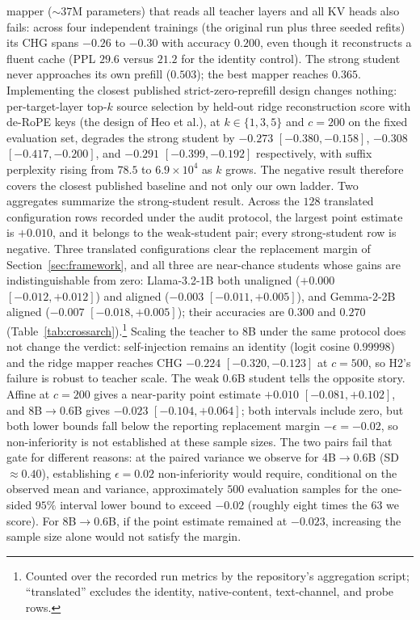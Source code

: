 \documentclass[10pt]{article}
\begin{document}
mapper ($\sim$$37$M parameters) that reads all teacher layers and all KV heads
also fails: across four independent trainings (the original run plus three
seeded refits) its CHG spans $-0.26$ to $-0.30$ with accuracy $0.200$, even
though it reconstructs a fluent cache (PPL $29.6$
versus $21.2$ for the identity control). The strong student never
approaches its own prefill ($0.503$); the best mapper reaches $0.365$.
Implementing the closest published strict-zero-reprefill design changes nothing:
per-target-layer top-$k$ source selection by held-out ridge reconstruction score
with de-RoPE keys (the design of Heo et al.), at $k\in\{1,3,5\}$ and $c{=}200$
on the fixed evaluation set, degrades the strong student by $-0.273$
$[-0.380,-0.158]$, $-0.308$ $[-0.417,-0.200]$, and $-0.291$
$[-0.399,-0.192]$ respectively, with suffix perplexity rising from $78.5$ to
$6.9\times10^{4}$ as $k$ grows. The negative result therefore covers the closest
published baseline and not only our own ladder. Two
aggregates summarize the strong-student result. Across the $128$ translated configuration
rows recorded under the audit protocol, the largest point estimate is $+0.010$,
and it belongs to the weak-student pair; every strong-student row is negative.
Three translated configurations clear the replacement margin of
Section~\ref{sec:framework}, and all three are near-chance students whose gains
are indistinguishable from zero: Llama-3.2-1B both unaligned ($+0.000$
$[-0.012, +0.012]$) and aligned ($-0.003$ $[-0.011, +0.005]$), and Gemma-2-2B
aligned ($-0.007$ $[-0.018, +0.005]$); their accuracies are $0.300$ and $0.270$
(Table~\ref{tab:crossarch}).\footnote{Counted over the recorded run metrics by the repository's
aggregation script; ``translated'' excludes the identity, native-content,
text-channel, and probe rows.} Scaling
the teacher to 8B under the same protocol does not change the verdict:
self-injection remains an identity (logit cosine $0.99998$) and the ridge
mapper reaches CHG $-0.224$ $[-0.320, -0.123]$ at $c{=}500$, so H2's failure
is robust to teacher scale. The
weak 0.6B student tells the opposite story. Affine at $c{=}200$ gives a
near-parity point estimate $+0.010$ $[-0.081, +0.102]$, and 8B$\to$0.6B gives
$-0.023$ $[-0.104, +0.064]$; both intervals include zero, but both lower
bounds fall below the reporting replacement margin $-\epsilon=-0.02$, so
non-inferiority is not established at these sample sizes. The two pairs fail
that gate for different reasons: at the paired variance we observe for
4B$\to$0.6B (SD $\approx 0.40$), establishing $\epsilon{=}0.02$
non-inferiority would require, conditional on the observed mean and variance,
approximately $500$ evaluation samples for the one-sided $95\%$ interval lower
bound to exceed $-0.02$ (roughly eight times the $63$ we score). For
8B$\to$0.6B, if the point estimate remained at $-0.023$, increasing the sample
size alone would not satisfy the margin.
\end{document}
